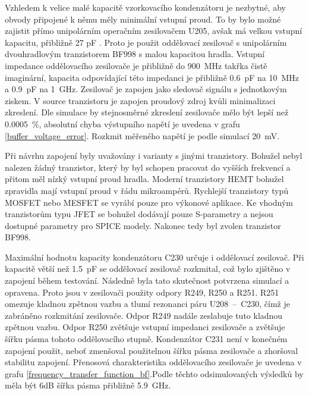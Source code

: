 Vzhledem k velice malé kapacitě vzorkovacího kondenzátoru je nezbytné, aby obvody připojené k němu měly minimální vstupní proud. To by bylo možné zajistit přímo unipolárním operačním zesilovačem U205, avšak má velkou vstupní kapacitu, přibližně 27 pF \cite{oscilloscopefrontend}. Proto je použit oddělovací zesilovač s unipolárním dvouhradlovým tranzistorem BF998 s malou kapacitou hradla. Vstupní impedance oddělovacího zesilovače je přibližně do \SI{900}{\mega\hertz} takřka čistě imaginární, kapacita odpovídající této impedanci je přibližně \SI{0.6}{\pico\farad} na \SI{10}{\mega\hertz} a \SI{0.9}{\pico\farad} na \SI{1}{\giga\hertz}. Zesilovač je zapojen jako sledovač signálu s jednotkovým ziskem. V source tranzistoru je zapojen proudový zdroj kvůli minimalizaci zkreslení. Dle simulace by stejnosměrné zkreslení zesilovače mělo být lepší než \SI{0.0005}{\%}, absolutní chyba výstupního napětí je uvedena v grafu \ref{buffer_voltage_error}. Rozkmit měřeného napětí je podle simulací \SI{20}{\milli\volt}.

Při návrhu zapojení byly uvažovány i varianty s jinými tranzistory. Bohužel nebyl nalezen žádný tranzistor, který by byl  schopen pracovat do vyšších frekvencí a přitom měl nízký vstupní proud hradla. Moderní tranzistory HEMT bohužel zpravidla mají vstupní proud v řádu mikroampérů. Rychlejší tranzistory typů MOSFET nebo MESFET se vyrábí pouze pro výkonové aplikace. Ke vhodným tranzistorům typu JFET se bohužel dodávají pouze S-parametry a nejsou dostupné parametry pro SPICE modely. Nakonec tedy byl zvolen tranzistor BF998. 

Maximální hodnotu kapacity kondenzátoru C230 určuje i oddělovací zesilovač. Při kapacitě větší než \SI{1.5}{\pico\farad} se oddělovací zesilovač rozkmital, což bylo zjištěno v zapojení během testování. Následně byla tato skutečnost potvrzena simulací a opravena. Proto jsou v zesilovači použity odpory R249, R250 a R251. R251 omezuje kladnou zpětnou vazbu a tlumí rezonanci páru U208~--~C230, čímž je zabráněno rozkmitání zesilovače. Odpor R249 nadále zeslabuje tuto kladnou zpětnou vazbu. Odpor R250 zvětšuje vstupní impedanci zesilovače a zvětšuje šířku pásma tohoto oddělovacího stupně. Kondenzátor C231 není v konečném zapojení použit, neboť zmenšoval použitelnou šířku pásma zesilovače a zhoršoval stabilitu zapojení. Přenosová charakteristika oddělovacího zesilovače je uvedena v grafu \ref{frequency_transfer_function_bf}.Podle těchto odsimulovaných výsledků by měla být 6\si{\deci\bel} šířka pásma přibližně \SI{5.9}{\giga\hertz}.

